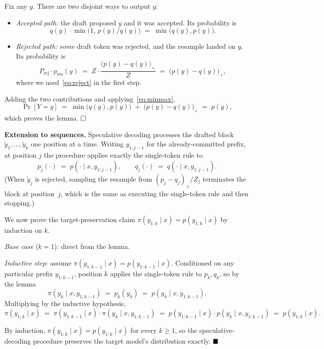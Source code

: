 \documentclass{article}
\begin{document}
{    Fix any $y$. There are two disjoint ways to output $y$:
    \begin{itemize}
        \item \emph{Accepted path:} the draft proposed $y$ and it was accepted. Its probability is
        \[
            q(y) \cdot \min\!\bigl(1,\, p(y)/q(y)\bigr) \;=\; \min\bigl(q(y), p(y)\bigr).
        \]
        \item \emph{Rejected path:} \emph{some} draft token was rejected, and the resample landed on $y$. Its probability is
        \[
            P_{\mathrm{rej}} \cdot p_{\mathrm{res}}(y) \;=\; Z \cdot \frac{\bigl(p(y) - q(y)\bigr)_{+}}{Z} \;=\; \bigl(p(y) - q(y)\bigr)_{+},
        \]
        where we used~\eqref{eq:reject} in the first step.
    \end{itemize}
    Adding the two contributions and applying~\eqref{eq:minmax},
    \begin{equation*}
        \Pr[Y = y] \;=\; \min\bigl(q(y), p(y)\bigr) \;+\; \bigl(p(y) - q(y)\bigr)_{+} \;=\; p(y),
    \end{equation*}
    which proves the lemma. $\hfill\square$

    \textbf{Extension to sequences.} Speculative decoding processes the drafted block $\tilde y_1, \ldots, \tilde y_k$ one position at a time. Writing $y_{1:j-1}$ for the already-committed prefix, at position $j$ the procedure applies exactly the single-token rule to
    \[
        p_j(\cdot) \;=\; p(\cdot \mid x, y_{1:j-1}), \qquad q_j(\cdot) \;=\; q(\cdot \mid x, y_{1:j-1}).
    \]
    (When $\tilde y_j$ is rejected, sampling the resample from $(p_j - q_j)_+ / Z_j$ terminates the block at position~$j$, which is the same as executing the single-token rule and then stopping.)

    We now prove the target-preservation claim $\pi(y_{1:k} \mid x) = p(y_{1:k} \mid x)$ by induction on $k$.

    \emph{Base case} ($k = 1$): direct from the lemma.

    \emph{Inductive step}: assume $\pi(y_{1:k-1} \mid x) = p(y_{1:k-1} \mid x)$. Conditioned on any particular prefix $y_{1:k-1}$, position $k$ applies the single-token rule to $p_k, q_k$, so by the lemma
    \[
        \pi(y_k \mid x, y_{1:k-1}) \;=\; p_k(y_k) \;=\; p(y_k \mid x, y_{1:k-1}).
    \]
    Multiplying by the inductive hypothesis,
    \begin{equation*}
        \pi(y_{1:k} \mid x) \;=\; \pi(y_{1:k-1} \mid x) \cdot \pi(y_k \mid x, y_{1:k-1})
        \;=\; p(y_{1:k-1} \mid x) \cdot p(y_k \mid x, y_{1:k-1}) \;=\; p(y_{1:k} \mid x).
    \end{equation*}

    By induction, $\pi(y_{1:k} \mid x) = p(y_{1:k} \mid x)$ for every $k \ge 1$, so the speculative-decoding procedure preserves the target model's distribution exactly. $\hfill\blacksquare$
}
\end{document}
